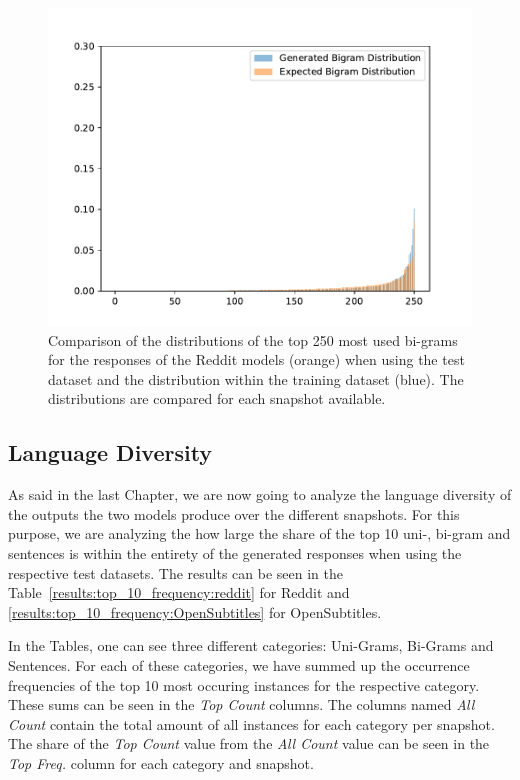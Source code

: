 \begin{figure}[H]
	\centering
	\small
	\endminipage\hfill
	\includegraphics[width=\linewidth]{img/plots/reddit/bigram_distribution_comparison_step_3000000.pdf}
	\centering
	\small
	\endminipage\hfill
	\caption{Comparison of the distributions of the top 250 most used bi-grams for the responses of the Reddit models (orange) when using the test dataset and the distribution within the training dataset (blue). The distributions are compared for each snapshot available.}
	\label{results:bigram:distributions:reddit}
\end{figure}

\subsection{Language Diversity}
As said in the last Chapter, we are now going to analyze the language diversity of the outputs the two models produce over the different snapshots. For this purpose, we are analyzing the how large the share of the top 10 uni-, bi-gram and sentences is within the entirety of the generated responses when using the respective test datasets. The results can be seen in the Table~\ref{results:top_10_frequency:reddit} for Reddit and \ref{results:top_10_frequency:OpenSubtitles} for OpenSubtitles. 

In the Tables, one can see three different categories: Uni-Grams, Bi-Grams and Sentences. For each of these categories, we have summed up the occurrence frequencies of the top 10 most occuring instances for the respective category. These sums can be seen in the \emph{Top Count} columns. The columns named \emph{All Count} contain the total amount of all instances for each category per snapshot. The share of the \emph{Top Count} value from the \emph{All Count} value can be seen in the \emph{Top Freq.} column for each category and snapshot.

